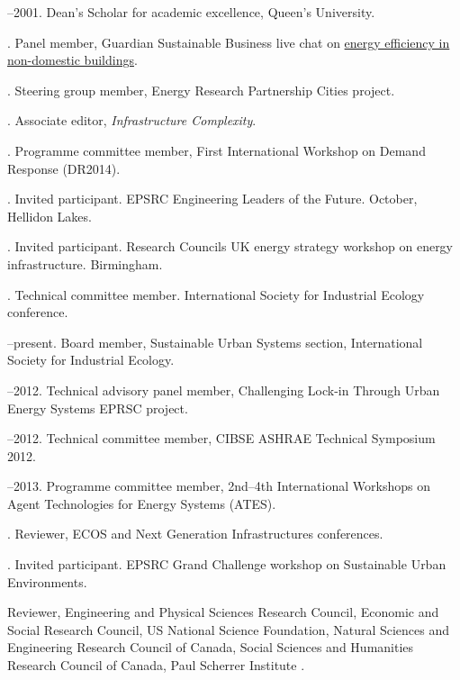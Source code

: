 \documentclass[11pt,a4paper]{article}
\begin{document}
--2001.  Dean's Scholar for academic excellence, Queen's University.

\bigskip 

\noindent{}%
. Panel member, Guardian Sustainable Business live chat on \href{http://www.theguardian.com/sustainable-business/energy-efficiency-commercial-properties-live-chat}{energy efficiency in non-domestic buildings}.

. Steering group member, Energy Research Partnership Cities project.

. Associate editor, \emph{Infrastructure Complexity}.

. Programme committee member, First International Workshop on Demand Response (DR2014).

. Invited participant.  EPSRC Engineering Leaders of the Future. October, Hellidon Lakes.

. Invited participant.  Research Councils UK energy strategy workshop on energy infrastructure.  Birmingham.

. Technical committee member.  International Society for Industrial Ecology conference.

--present. Board member, Sustainable Urban Systems section, International Society for Industrial Ecology.

--2012. Technical advisory panel member, Challenging Lock-in Through Urban Energy Systems EPRSC project.

--2012. Technical committee member, CIBSE ASHRAE Technical Symposium 2012.

--2013. Programme committee member, 2nd--4th International Workshops on Agent Technologies for Energy Systems (ATES).

. Reviewer, ECOS and Next Generation Infrastructures conferences.

. Invited participant.  EPSRC Grand Challenge workshop on Sustainable Urban Environments.

\ind Reviewer, Engineering and Physical Sciences Research Council, Economic and Social Research Council, US National Science Foundation, Natural Sciences and Engineering Research Council of Canada, Social Sciences and Humanities Research Council of Canada, Paul Scherrer Institute .
\end{document}
